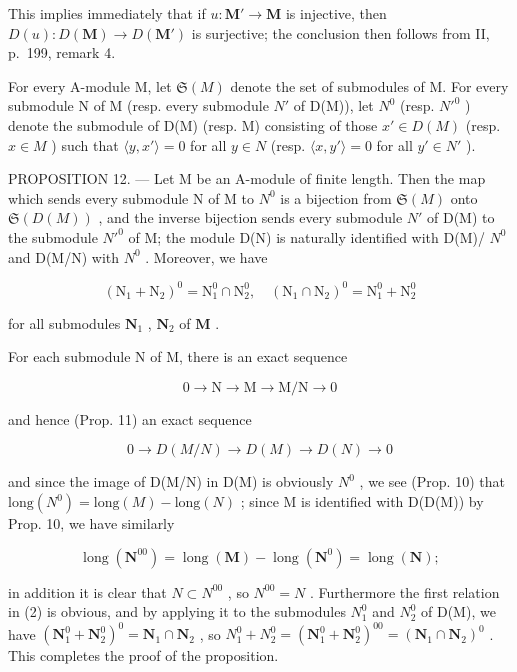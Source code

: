 This implies immediately that if \(u: \mathbf{M}' \to \mathbf{M}\) is injective, then \(D(u): D(\mathbf{M}) \to D(\mathbf{M}')\) is surjective; the conclusion then follows from II, p.~199, remark 4.

For every A-module M, let \(\mathfrak{S}(M)\) denote the set of submodules of M. For every submodule N of M (resp. every submodule \(N'\) of D(M)), let \(N^0\) (resp. \(N'^0\) ) denote the submodule of D(M) (resp. M) consisting of those \(x' \in D(M)\) (resp. \(x \in M\) ) such that \(\langle y, x' \rangle = 0\) for all \(y \in N\) (resp. \(\langle x, y' \rangle = 0\) for all \(y' \in N'\) ).

PROPOSITION 12. --- Let M be an A-module of finite length. Then the map which sends every submodule N of M to \(N^{0}\) is a bijection from \(\mathfrak{S}(M)\) onto \(\mathfrak{S}(D(M))\) , and the inverse bijection sends every submodule \(N'\) of D(M) to the submodule \(N'^{0}\) of M; the module D(N) is naturally identified with D(M)/ \(N^{0}\) and D(M/N) with \(N^{0}\) . Moreover, we have

\[
\left(\mathrm{N} _ {1} + \mathrm{N} _ {2}\right) ^ {0} = \mathrm{N} _ {1} ^ {0} \cap \mathrm{N} _ {2} ^ {0}, \quad \left(\mathrm{N} _ {1} \cap \mathrm{N} _ {2}\right) ^ {0} = \mathrm{N} _ {1} ^ {0} + \mathrm{N} _ {2} ^ {0}\tag{2}
\]

for all submodules \(\mathbf{N}_1\) , \(\mathbf{N}_2\) of \(\mathbf{M}\) .

For each submodule N of M, there is an exact sequence

\[
0 \rightarrow \mathrm{N} \rightarrow \mathrm{M} \rightarrow \mathrm{M} / \mathrm{N} \rightarrow 0
\]

and hence (Prop. 11) an exact sequence

\[
0 \rightarrow D (M / N) \rightarrow D (M) \rightarrow D (N) \rightarrow 0
\]

and since the image of D(M/N) in D(M) is obviously \(N^{0}\) , we see (Prop. 10) that \(\text{long}(N^{0}) = \text{long}(M) - \text{long}(N)\) ; since M is identified with D(D(M)) by Prop. 10, we have similarly

\[
\operatorname{long} \left(\mathbf {N} ^ {0 0}\right) = \operatorname{long} (\mathbf {M}) - \operatorname{long} \left(\mathbf {N} ^ {0}\right) = \operatorname{long} (\mathbf {N});
\]

in addition it is clear that \(N \subset N^{00}\) , so \(N^{00} = N\) . Furthermore the first relation in (2) is obvious, and by applying it to the submodules \(N_{1}^{0}\) and \(N_{2}^{0}\) of D(M), we have \((\mathbf{N}_{1}^{0} + \mathbf{N}_{2}^{0})^{0} = \mathbf{N}_{1} \cap \mathbf{N}_{2}\) , so \(N_{1}^{0} + N_{2}^{0} = (\mathbf{N}_{1}^{0} + \mathbf{N}_{2}^{0})^{00} = (\mathbf{N}_{1} \cap \mathbf{N}_{2})^{0}\) . This completes the proof of the proposition.

